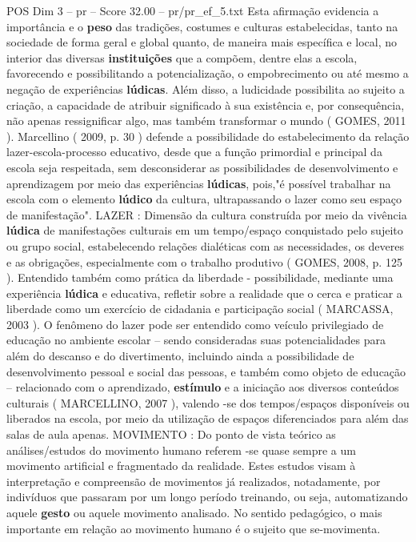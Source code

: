 \begin{textsample}{POS Dim 3 – pr – Score 32.00 – pr/pr\_ef\_5.txt}
Esta afirmação evidencia a importância e o \textbf{peso} das tradições, costumes e culturas estabelecidas, tanto na sociedade de forma geral e global quanto, de maneira mais específica e local, no interior das diversas \textbf{instituições} que a compõem, dentre elas a escola, favorecendo e possibilitando a potencialização, o empobrecimento ou até mesmo a negação de experiências \textbf{lúdicas}.
Além disso, a ludicidade possibilita ao sujeito a criação, a capacidade de atribuir significado à sua existência e, por consequência, não apenas ressignificar algo, mas também transformar o mundo ( GOMES, 2011 ).
Marcellino ( 2009, p. 30 ) defende a possibilidade do estabelecimento da relação lazer-escola-processo educativo, desde que a função primordial e principal da escola seja respeitada, sem desconsiderar as possibilidades de desenvolvimento e aprendizagem por meio das experiências \textbf{lúdicas}, pois,"é possível trabalhar na escola com o elemento \textbf{lúdico} da cultura, ultrapassando o lazer como seu espaço de manifestação".
LAZER : Dimensão da cultura construída por meio da vivência \textbf{lúdica} de manifestações culturais em um tempo/espaço conquistado pelo sujeito ou grupo social, estabelecendo relações dialéticas com as necessidades, os deveres e as obrigações, especialmente com o trabalho produtivo ( GOMES, 2008, p. 125 ).
Entendido também como prática da liberdade - possibilidade, mediante uma experiência \textbf{lúdica} e educativa, refletir sobre a realidade que o cerca e praticar a liberdade como um exercício de cidadania e participação social ( MARCASSA, 2003 ).
O fenômeno do lazer pode ser entendido como veículo privilegiado de educação no ambiente escolar – sendo consideradas suas potencialidades para além do descanso e do divertimento, incluindo ainda a possibilidade de desenvolvimento pessoal e social das pessoas, e também como objeto de educação – relacionado com o aprendizado, \textbf{estímulo} e a iniciação aos diversos conteúdos culturais ( MARCELLINO, 2007 ), valendo -se dos tempos/espaços disponíveis ou liberados na escola, por meio da utilização de espaços diferenciados para além das salas de aula apenas.
MOVIMENTO : Do ponto de vista teórico as análises/estudos do movimento humano referem -se quase sempre a um movimento artificial e fragmentado da realidade.
Estes estudos visam à interpretação e compreensão de movimentos já realizados, notadamente, por indivíduos que passaram por um longo período treinando, ou seja, automatizando aquele \textbf{gesto} ou aquele movimento analisado.
No sentido pedagógico, o mais importante em relação ao movimento humano é o sujeito que se-movimenta.

\end{textsample}
